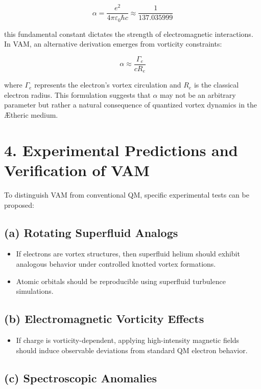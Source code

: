 \[
    \alpha = \frac{e^2}{4\pi \varepsilon_0 \hbar c} \approx \frac{1}{137.035999}
\]

this fundamental constant dictates the strength of electromagnetic interactions. In VAM, an alternative derivation emerges from vorticity constraints:

\[
    \alpha \approx \frac{\Gamma_e}{c R_e}
\]

where \(\Gamma_e\) represents the electron's vortex circulation and \(R_e\) is the classical electron radius. This formulation suggests that \(\alpha\) may not be an arbitrary parameter but rather a natural consequence of quantized vortex dynamics in the Ætheric medium.

\section*{4. Experimental Predictions and Verification of VAM}

To distinguish VAM from conventional QM, specific experimental tests can be proposed:

\subsection*{(a) Rotating Superfluid Analogs}

\begin{itemize}
    \item If electrons are vortex structures, then superfluid helium should exhibit analogous behavior under controlled knotted vortex formations.
    \item Atomic orbitals should be reproducible using superfluid turbulence simulations.
\end{itemize}

\subsection*{(b) Electromagnetic Vorticity Effects}

\begin{itemize}
    \item If charge is vorticity-dependent, applying high-intensity magnetic fields should induce observable deviations from standard QM electron behavior.
\end{itemize}

\subsection*{(c) Spectroscopic Anomalies}

